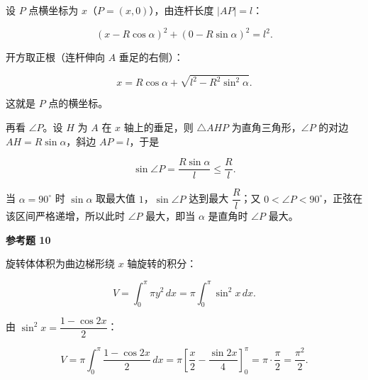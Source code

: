\begin{answer}
设 $P$ 点横坐标为 $x$（$P=(x,0)$），由连杆长度 $|AP|=l$：

\nopagebreak[4]
\[
(x-R\cos\alpha)^2+(0-R\sin\alpha)^2=l^2.
\]

开方取正根（连杆伸向 $A$ 垂足的右侧）：

\nopagebreak[4]
\[
x=R\cos\alpha+\sqrt{l^2-R^2\sin^2\alpha}.
\]

这就是 $P$ 点的横坐标。

再看 $\angle P$。设 $H$ 为 $A$ 在 $x$ 轴上的垂足，则 $\triangle AHP$ 为直角三角形，$\angle P$ 的对边 $AH=R\sin\alpha$，斜边 $AP=l$，于是

\nopagebreak[4]
\[
\sin\angle P=\frac{R\sin\alpha}{l}\le\frac{R}{l}.
\]

当 $\alpha=90^\circ$ 时 $\sin\alpha$ 取最大值 $1$，$\sin\angle P$ 达到最大 $\dfrac{R}{l}$；又 $0<\angle P<90^\circ$，正弦在该区间严格递增，所以此时 $\angle P$ 最大，即当 $\alpha$ 是直角时 $\angle P$ 最大。

\textbf{参考题 10}

旋转体体积为曲边梯形绕 $x$ 轴旋转的积分：

\nopagebreak[4]
\[
V=\int_0^{\pi}\pi y^2\,dx
=\pi\int_0^{\pi}\sin^2x\,dx.
\]

由 $\sin^2x=\dfrac{1-\cos2x}{2}$：

\nopagebreak[4]
\[
V=\pi\int_0^{\pi}\frac{1-\cos2x}{2}\,dx
=\pi\left[\frac{x}{2}-\frac{\sin2x}{4}\right]_0^{\pi}
=\pi\cdot\frac{\pi}{2}
=\frac{\pi^2}{2}.
\]


\end{answer}
